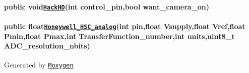 \paragraph*{{\ttfamily public void}\href{#classLogger_1a923b296832bd4222da649ebc66427ac1}{\tt {\ttfamily Hack\+HD}}{\ttfamily (int control\+\_\+pin,bool want\+\_\+camera\+\_\+on)}}

\paragraph*{{\ttfamily public float}\href{#classLogger_1a9808967fdf91f10602aa883df35145b3}{\tt {\ttfamily Honeywell\+\_\+\+H\+S\+C\+\_\+analog}}{\ttfamily (int pin,float Vsupply,float Vref,float Pmin,float Pmax,int Transfer\+Function\+\_\+number,int units,uint8\+\_\+t A\+D\+C\+\_\+resolution\+\_\+nbits)}}

Generated by \href{https://sourcey.com/moxygen}{\tt Moxygen} 